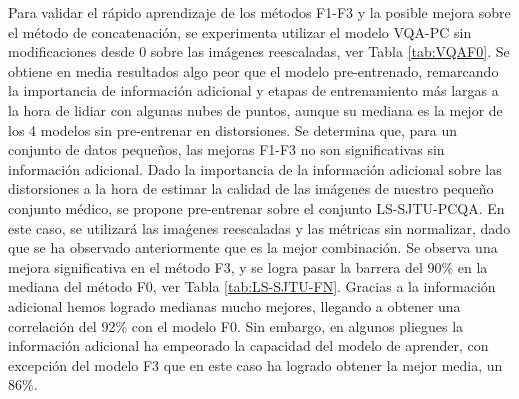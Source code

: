 Para validar el rápido aprendizaje de los métodos F1-F3 y la posible mejora 
sobre el método de concatenación, se experimenta utilizar el modelo VQA-PC sin 
modificaciones desde 0 sobre las imágenes reescaladas, ver Tabla \ref{tab:VQAF0}.
Se obtiene en media resultados algo peor que el modelo 
pre-entrenado, remarcando la importancia de información adicional y etapas 
de entrenamiento más largas a la hora de lidiar con algunas nubes de puntos, aunque su
mediana es la mejor de los 4 modelos sin pre-entrenar en distorsiones. 
Se determina que, para un conjunto de datos pequeños, las mejoras F1-F3 no son significativas sin información adicional. 
Dado la importancia de la información adicional sobre las distorsiones a la 
hora de estimar la calidad de las imágenes de nuestro pequeño conjunto médico, 
se propone pre-entrenar sobre el conjunto LS-SJTU-PCQA.
En este caso, se utilizará las imaǵenes reescaladas y las métricas sin normalizar, 
dado que se ha observado anteriormente que es la mejor combinación.
Se observa una mejora significativa en el método F3, y se logra 
pasar la barrera del 90\% en la mediana del método F0, ver Tabla \ref{tab:LS-SJTU-FN}.
Gracias a la información adicional hemos logrado medianas mucho mejores, llegando a 
obtener una correlación del 92\% con el modelo F0. Sin embargo, en algunos pliegues 
la información adicional ha empeorado la capacidad del modelo de aprender, con 
excepción del modelo F3 que en este caso ha logrado obtener la mejor media, un 86\%.
  
